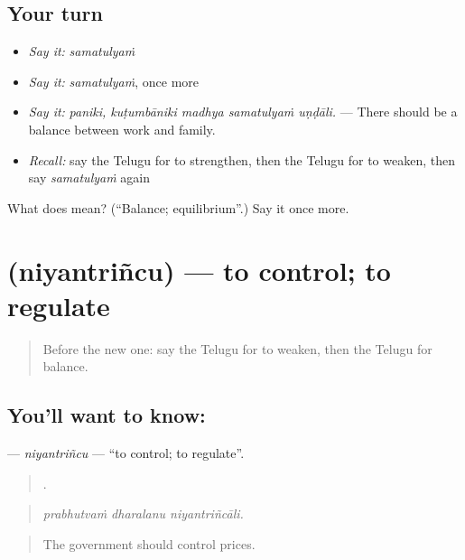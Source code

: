 \subsection*{Your turn}
\begin{itemize}
\raggedright
  \item \emph{Say it:} \emph{samatulyaṁ}
  \item \emph{Say it:} \emph{samatulyaṁ}, once more
  \item \emph{Say it:} \emph{paniki, kuṭumbāniki madhya samatulyaṁ uṇḍāli.} — There should be a balance between work and family.
  \item \emph{Recall:} say the Telugu for to strengthen, then the Telugu for to weaken, then say \emph{samatulyaṁ} again
\end{itemize}

\begin{tcolorbox}[breakable,colback=teal!4,colframe=teal!35!black,title={Before you move on}]
What does  mean? (\textquotedblleft{}Balance; equilibrium\textquotedblright{}.) Say it once more.
\end{tcolorbox}
\section[\texorpdfstring{\te{నియంత్రించు} (niyantriñcu)}{నియంత్రించు (niyantriñcu)}]{ (niyantriñcu) — to control; to regulate}

\label{lesson:TE-C430-niyantrincu}



\begin{quote}
Before the new one: say the Telugu for to weaken, then the Telugu for balance.
\end{quote}

\subsection*{You'll want to know: }
\textbf{} — \emph{niyantriñcu} — \textquotedblleft{}to control; to regulate\textquotedblright{}.

\begin{quote}
  .
\end{quote}

\begin{quote}
\emph{prabhutvaṁ dharalanu niyantriñcāli.}
\end{quote}

\begin{quote}
The government should control prices.
\end{quote}


